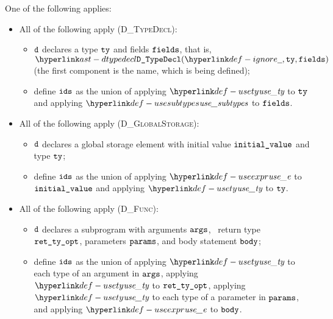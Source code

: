 \ProseParagraph
One of the following applies:
\begin{itemize}
  \item All of the following apply (\textsc{D\_TypeDecl}):
  \begin{itemize}
    \item $\texttt{d}$ declares a type $\texttt{ty}$ and fields $\texttt{fields}$, that is,
          $\DTypeDecl(\Ignore, \tty, \fields)$ (the first component is the name, which is being defined);
    \item define $\texttt{ids}$ as the union of applying $\usety$ to $\texttt{ty}$ and applying $\usesubtypes$ to $\texttt{fields}$.
  \end{itemize}

  \item All of the following apply (\textsc{D\_GlobalStorage}):
  \begin{itemize}
    \item $\texttt{d}$ declares a global storage element with initial value $\texttt{initial\_value}$ and type $\texttt{ty}$;
    \item define $\texttt{ids}$ as the union of applying $\useexpr$ to $\texttt{initial\_value}$ and applying $\usety$ to $\texttt{ty}$.
  \end{itemize}

  \item All of the following apply (\textsc{D\_Func}):
  \begin{itemize}
    \item $\texttt{d}$ declares a subprogram with arguments $\texttt{args}$, \optional\ return type \\
          $\texttt{ret\_ty\_opt}$, parameters $\texttt{params}$, and body statement $\texttt{body}$;
    \item define $\texttt{ids}$ as the union of applying $\usety$ to each type of an argument in $\texttt{args}$,
          applying $\usety$ to $\texttt{ret\_ty\_opt}$, applying $\usety$ to each type of a parameter in $\texttt{params}$,
          and applying $\useexpr$ to $\texttt{body}$.
  \end{itemize}
\end{itemize}

